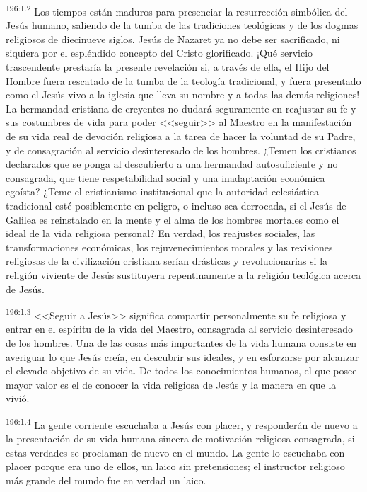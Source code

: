 \par 
\textsuperscript{196:1.2} Los tiempos están maduros para presenciar la resurrección simbólica del Jesús humano, saliendo de la tumba de las tradiciones teológicas y de los dogmas religiosos de diecinueve siglos. Jesús de Nazaret ya no debe ser sacrificado, ni siquiera por el espléndido concepto del Cristo glorificado. ¡Qué servicio trascendente prestaría la presente revelación si, a través de ella, el Hijo del Hombre fuera rescatado de la tumba de la teología tradicional, y fuera presentado como el Jesús vivo a la iglesia que lleva su nombre y a todas las demás religiones! La hermandad cristiana de creyentes no dudará seguramente en reajustar su fe y sus costumbres de vida para poder <<seguir>> al Maestro en la manifestación de su vida real de devoción religiosa a la tarea de hacer la voluntad de su Padre, y de consagración al servicio desinteresado de los hombres. ¿Temen los cristianos declarados que se ponga al descubierto a una hermandad autosuficiente y no consagrada, que tiene respetabilidad social y una inadaptación económica egoísta? ¿Teme el cristianismo institucional que la autoridad eclesiástica tradicional esté posiblemente en peligro, o incluso sea derrocada, si el Jesús de Galilea es reinstalado en la mente y el alma de los hombres mortales como el ideal de la vida religiosa personal? En verdad, los reajustes sociales, las transformaciones económicas, los rejuvenecimientos morales y las revisiones religiosas de la civilización cristiana serían drásticas y revolucionarias si la religión viviente de Jesús sustituyera repentinamente a la religión teológica acerca de Jesús.

\par 
\textsuperscript{196:1.3} <<Seguir a Jesús>> significa compartir personalmente su fe religiosa y entrar en el espíritu de la vida del Maestro, consagrada al servicio desinteresado de los hombres. Una de las cosas más importantes de la vida humana consiste en averiguar lo que Jesús creía, en descubrir sus ideales, y en esforzarse por alcanzar el elevado objetivo de su vida. De todos los conocimientos humanos, el que posee mayor valor es el de conocer la vida religiosa de Jesús y la manera en que la vivió.

\par 
\textsuperscript{196:1.4} La gente corriente escuchaba a Jesús con placer, y responderán de nuevo a la presentación de su vida humana sincera de motivación religiosa consagrada, si estas verdades se proclaman de nuevo en el mundo. La gente lo escuchaba con placer porque era uno de ellos, un laico sin pretensiones; el instructor religioso más grande del mundo fue en verdad un laico.

